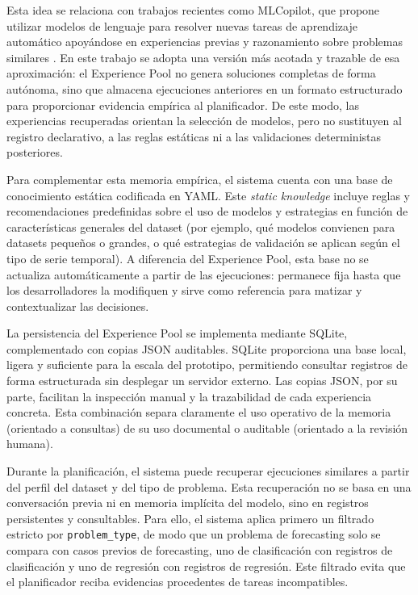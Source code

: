\documentclass[12pt,a4paper]{article}
\theoremstyle{plain}
\begin{document}
Esta idea se relaciona con trabajos recientes como MLCopilot, que propone utilizar modelos de lenguaje para resolver nuevas tareas de aprendizaje automático apoyándose en experiencias previas y razonamiento sobre problemas similares \cite{mlcopilot}. En este trabajo se adopta una versión más acotada y trazable de esa aproximación: el Experience Pool no genera soluciones completas de forma autónoma, sino que almacena ejecuciones anteriores en un formato estructurado para proporcionar evidencia empírica al planificador. De este modo, las experiencias recuperadas orientan la selección de modelos, pero no sustituyen al registro declarativo, a las reglas estáticas ni a las validaciones deterministas posteriores.


Para complementar esta memoria empírica, el sistema cuenta con una base de conocimiento estática codificada en YAML. Este \textit{static knowledge} incluye reglas y recomendaciones predefinidas sobre el uso de modelos y estrategias en función de características generales del dataset (por ejemplo, qué modelos convienen para datasets pequeños o grandes, o qué estrategias de validación se aplican según el tipo de serie temporal). A diferencia del Experience Pool, esta base no se actualiza automáticamente a partir de las ejecuciones: permanece fija hasta que los desarrolladores la modifiquen y sirve como referencia para matizar y contextualizar las decisiones.

La persistencia del Experience Pool se implementa mediante SQLite, complementado con copias JSON auditables. SQLite proporciona una base local, ligera y suficiente para la escala del prototipo, permitiendo consultar registros de forma estructurada sin desplegar un servidor externo. Las copias JSON, por su parte, facilitan la inspección manual y la trazabilidad de cada experiencia concreta. Esta combinación separa claramente el uso operativo de la memoria (orientado a consultas) de su uso documental o auditable (orientado a la revisión humana).

Durante la planificación, el sistema puede recuperar ejecuciones similares a partir del perfil del dataset y del tipo de problema. Esta recuperación no se basa en una conversación previa ni en memoria implícita del modelo, sino en registros persistentes y consultables. Para ello, el sistema aplica primero un filtrado estricto por \texttt{problem\_type}, de modo que un problema de forecasting solo se compara con casos previos de forecasting, uno de clasificación con registros de clasificación y uno de regresión con registros de regresión. Este filtrado evita que el planificador reciba evidencias procedentes de tareas incompatibles.
\end{document}
